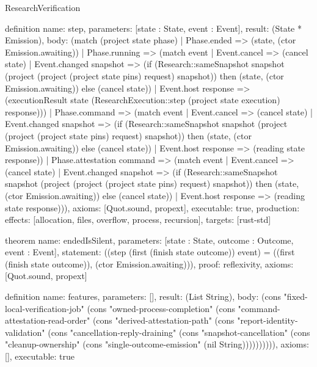 \begin{lexlean}{ResearchVerification}
\begin{semanticmodule}
definition{
  name: step,
  parameters: [state : State, event : Event],
  result: (State * Emission),
  body: (match (project state phase)
 | Phase.ended => (state, (ctor Emission.awaiting))
 | Phase.running => (match event
   | Event.cancel => (cancel state)
   | Event.changed snapshot => (if (Research::sameSnapshot snapshot (project (project (project state pins) request) snapshot)) then (state, (ctor Emission.awaiting)) else (cancel state))
   | Event.host response => (executionResult state (ResearchExecution::step (project state execution) response)))
 | Phase.command => (match event
   | Event.cancel => (cancel state)
   | Event.changed snapshot => (if (Research::sameSnapshot snapshot (project (project (project state pins) request) snapshot)) then (state, (ctor Emission.awaiting)) else (cancel state))
   | Event.host response => (reading state response))
 | Phase.attestation command => (match event
   | Event.cancel => (cancel state)
   | Event.changed snapshot => (if (Research::sameSnapshot snapshot (project (project (project state pins) request) snapshot)) then (state, (ctor Emission.awaiting)) else (cancel state))
   | Event.host response => (reading state response))),
  axioms: [Quot.sound, propext],
  executable: true,
  production: {effects: [allocation, files, overflow, process, recursion], targets: [rust-std]}
}

theorem{
  name: endedIsSilent,
  parameters: [state : State, outcome : Outcome, event : Event],
  statement: ((step (first (finish state outcome)) event) = ((first (finish state outcome)), (ctor Emission.awaiting))),
  proof: reflexivity{},
  axioms: [Quot.sound, propext]
}

definition{
  name: features,
  parameters: [],
  result: (List String),
  body: (cons "fixed-local-verification-job" (cons "owned-process-completion" (cons "command-attestation-read-order" (cons "derived-attestation-path" (cons "report-identity-validation" (cons "cancellation-reply-draining" (cons "snapshot-cancellation" (cons "cleanup-ownership" (cons "single-outcome-emission" (nil String)))))))))),
  axioms: [],
  executable: true
}

\end{semanticmodule}

\end{lexlean}
